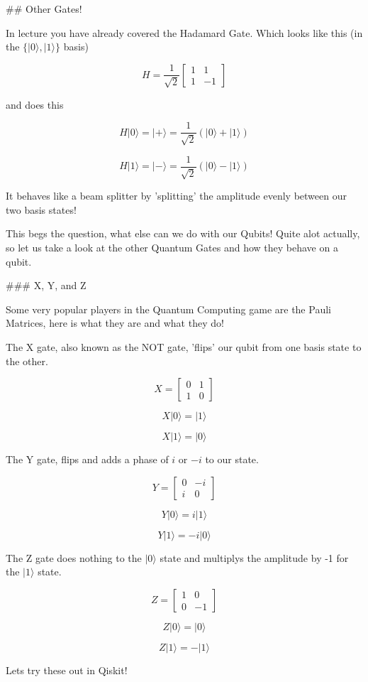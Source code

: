 ## Other Gates! 

In lecture you have already covered the Hadamard Gate. Which looks like this (in the $ \{ |0\rangle , |1\rangle \}$ basis)

$$
H=
\frac{1}{\sqrt{2}}
\begin{bmatrix}
1&1 \\
1&-1
\end{bmatrix}$$

and does this 

$$ H|0\rangle = |+\rangle = \frac{1}{\sqrt{2}} (|0\rangle + |1\rangle) $$ 
   
$$ H|1\rangle = |-\rangle = \frac{1}{\sqrt{2}} (|0\rangle - |1\rangle) $$
   
It behaves like a beam splitter by 'splitting' the amplitude evenly between our two basis states! 

This begs the question, what else can we do with our Qubits! Quite alot actually, so let us take a look at the other Quantum Gates and how they behave on a qubit. 


### X, Y, and Z 

Some very popular players in the Quantum Computing game are the Pauli Matrices, here is what they are and what they do! 

The X gate, also known as the NOT gate, 'flips' our qubit from one basis state to the other. 

$$
X=
\begin{bmatrix}
0&1 \\
1&0
\end{bmatrix} $$

$$ X|0\rangle = |1\rangle $$

$$ X|1\rangle = |0\rangle  $$

The Y gate, flips and adds a phase of $i$ or $-i$ to our state. 

$$
Y=
\begin{bmatrix}
0&-i \\
i&0
\end{bmatrix}$$

$$ Y|0\rangle = i|1\rangle $$
   
$$Y|1\rangle = -i|0\rangle  $$

The Z gate does nothing to the $|0\rangle$ state and multiplys the amplitude by -1 for the $|1\rangle$ state.

$$
Z=
\begin{bmatrix}
1&0 \\
0&-1
\end{bmatrix}$$

$$ Z|0\rangle = |0\rangle $$
   
$$ Z|1\rangle = -|1\rangle  $$
   

Lets try these out in Qiskit! 
